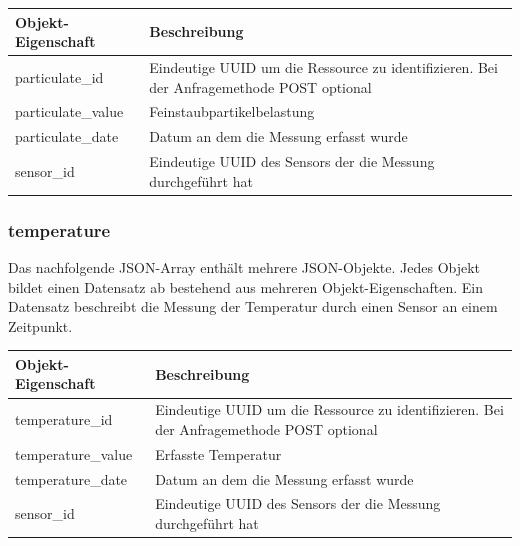 \begin{table}[H]
  \begin{tabularx}{\textwidth}{lX}
    \textbf{Objekt-Eigenschaft} & \textbf{Beschreibung}                                                                     \\ \toprule
    particulate\_id             & Eindeutige UUID um die Ressource zu identifizieren. Bei der Anfragemethode POST optional  \\
    particulate\_value          & Feinstaubpartikelbelastung                                                                \\
    particulate\_date           & Datum an dem die Messung erfasst wurde                                                    \\
    sensor\_id                  & Eindeutige UUID des Sensors der die Messung durchgeführt hat                              \\
  \end{tabularx}
\end{table}

\subsubsection{temperature}%
\label{sec:rest.json.temperature}

Das nachfolgende JSON-Array enthält mehrere JSON-Objekte. Jedes Objekt bildet
einen Datensatz ab bestehend aus mehreren Objekt-Eigenschaften. Ein Datensatz
beschreibt die Messung der Temperatur durch einen Sensor an einem Zeitpunkt.

\begin{jsoncode}
\end{jsoncode}

\begin{table}[H]
  \begin{tabularx}{\textwidth}{lX}
    \textbf{Objekt-Eigenschaft} & \textbf{Beschreibung}                                                                     \\ \toprule
    temperature\_id             & Eindeutige UUID um die Ressource zu identifizieren. Bei der Anfragemethode POST optional  \\
    temperature\_value          & Erfasste Temperatur                                                                       \\
    temperature\_date           & Datum an dem die Messung erfasst wurde                                                    \\
    sensor\_id                  & Eindeutige UUID des Sensors der die Messung durchgeführt hat                              \\
  \end{tabularx}
\end{table}

